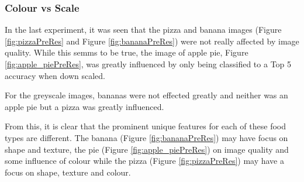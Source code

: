 \subsubsection*{Colour vs Scale}
In the last experiment, it was seen that the pizza and banana images (Figure \ref{fig:pizzaPreRes} and Figure \ref{fig:bananaPreRes}) were not really affected by image quality. While this semms to be true, the image of apple pie, Figure \ref{fig:apple_piePreRes}, was greatly influenced by only being classified to a Top 5 accuracy when down scaled.

For the greyscale images, bananas were not effected greatly and neither was an apple pie but a pizza was greatly influenced.

From this, it is clear that the prominent unique features for each of these food types are different. The banana (Figure \ref{fig:bananaPreRes}) may have focus on shape and texture, the pie (Figure \ref{fig:apple_piePreRes}) on image quality and some influence of colour while the pizza (Figure \ref{fig:pizzaPreRes}) may have a focus on shape, texture and colour.

